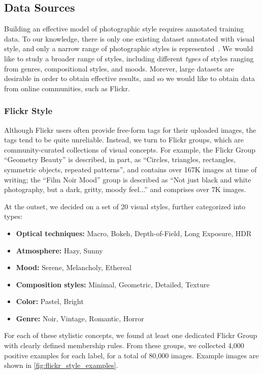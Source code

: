 \subsection{Data Sources}

Building an effective model of photographic style requires annotated training data.  To our knowledge, there is only one existing dataset annotated with visual style, and only a narrow range of photographic styles is represented~\parencite{Murray-CVPR-2012}.
We would like to study a broader range of styles, including different \textit{types} of styles ranging from genres, compositional styles, and moods.
Morever, large datasets are desirable in order to obtain effective results, and so we would like to obtain data from online communities, such as Flickr.

\subsubsection{Flickr Style}

Although Flickr users often provide free-form tags for their uploaded images, the tags tend to be quite unreliable.
Instead, we turn to Flickr groups, which are community-curated collections of visual concepts.
For example, the Flickr Group ``Geometry Beauty'' is described, in part, as ``Circles, triangles, rectangles, symmetric objects, repeated patterns'', and contains over 167K images at time of writing; the ``Film Noir Mood'' group is described as ``Not just  black and white photography, but a dark, gritty, moody feel...'' and comprises over 7K images.

At the outset, we decided on a set of 20 visual styles, further categorized into types:
\begin{itemize} \itemsep0.5pt
\item \textbf{Optical techniques:} Macro, Bokeh, Depth-of-Field, Long Exposure, HDR
\item \textbf{Atmosphere:} Hazy, Sunny
\item \textbf{Mood:} Serene, Melancholy, Ethereal
\item \textbf{Composition styles:} Minimal, Geometric, Detailed, Texture
\item \textbf{Color:} Pastel, Bright
\item \textbf{Genre:} Noir, Vintage, Romantic, Horror
\end{itemize}

For each of these stylistic concepts, we found at least one dedicated Flickr Group with clearly defined membership rules.
From these groups, we collected 4,000 positive examples for each label, for a total of 80,000 images.
Example images are shown in \autoref{fig:flickr_style_examples}.

